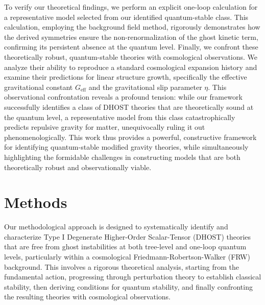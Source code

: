 \documentclass[twocolumn]{aastex631}
\begin{document}
To verify our theoretical findings, we perform an explicit one-loop calculation for a representative model selected from our identified quantum-stable class. This calculation, employing the background field method, rigorously demonstrates how the derived symmetries ensure the non-renormalization of the ghost kinetic term, confirming its persistent absence at the quantum level. Finally, we confront these theoretically robust, quantum-stable theories with cosmological observations. We analyze their ability to reproduce a standard cosmological expansion history and examine their predictions for linear structure growth, specifically the effective gravitational constant $G_{\text{eff}}$ and the gravitational slip parameter $\eta$. This observational confrontation reveals a profound tension: while our framework successfully identifies a class of DHOST theories that are theoretically sound at the quantum level, a representative model from this class catastrophically predicts repulsive gravity for matter, unequivocally ruling it out phenomenologically. This work thus provides a powerful, constructive framework for identifying quantum-stable modified gravity theories, while simultaneously highlighting the formidable challenges in constructing models that are both theoretically robust and observationally viable.


\section{Methods}
\label{sec:methods}
Our methodological approach is designed to systematically identify and characterize Type I Degenerate Higher-Order Scalar-Tensor (DHOST) theories that are free from ghost instabilities at both tree-level and one-loop quantum levels, particularly within a cosmological Friedmann-Robertson-Walker (FRW) background. This involves a rigorous theoretical analysis, starting from the fundamental action, progressing through perturbation theory to establish classical stability, then deriving conditions for quantum stability, and finally confronting the resulting theories with cosmological observations.
\end{document}
